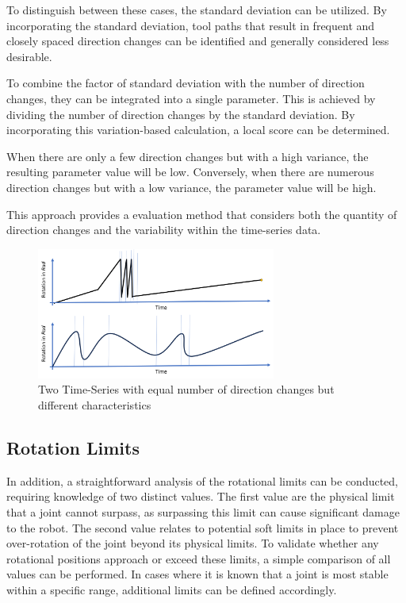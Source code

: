To distinguish between these cases, the standard deviation can be utilized. By incorporating the standard deviation, tool paths that result in frequent and closely spaced direction changes can be identified and generally considered less desirable.

To combine the factor of standard deviation with the number of direction changes, they can be integrated into a single parameter. This is achieved by dividing the number of direction changes by the standard deviation. By incorporating this variation-based calculation, a local score can be determined.

When there are only a few direction changes but with a high variance, the resulting parameter value will be low. Conversely, when there are numerous direction changes but with a low variance, the parameter value will be high.

This approach provides a evaluation method that considers both the quantity of direction changes and the variability within the time-series data.

\begin{figure}[H]
	\centerline{\includegraphics[width=0.7\textwidth]{figures/DirSTD.png}}
	\caption{Two Time-Series with equal number of direction changes but different characteristics}
	\label{dirchangeSTD}
\end{figure}

\subsection{Rotation Limits}\label{RotLim}
In addition, a straightforward analysis of the rotational limits can be conducted, requiring knowledge of two distinct values. The first value are the physical limit that a joint cannot surpass, as surpassing this limit can cause significant damage to the robot. The second value relates to potential soft limits in place to prevent over-rotation of the joint beyond its physical limits. To validate whether any rotational positions approach or exceed these limits, a simple comparison of all values can be performed. In cases where it is known that a joint is most stable within a specific range, additional limits can be defined accordingly.

